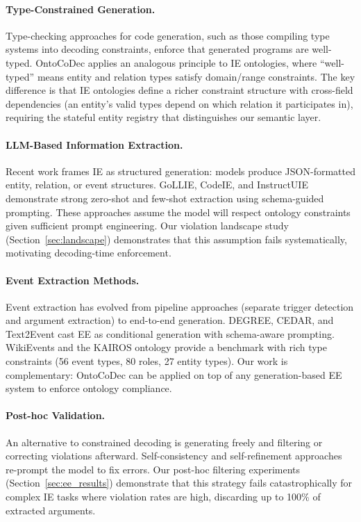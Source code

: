 \documentclass[11pt,a4paper]{article}
\newcommand{\sys}{OntoCoDec}
\begin{document}
\paragraph{Type-Constrained Generation.}
Type-checking approaches for code generation, such as those compiling type systems into decoding constraints, enforce that generated programs are well-typed. \sys{} applies an analogous principle to IE ontologies, where ``well-typed'' means entity and relation types satisfy domain/range constraints. The key difference is that IE ontologies define a richer constraint structure with cross-field dependencies (an entity's valid types depend on which relation it participates in), requiring the stateful entity registry that distinguishes our semantic layer.

\paragraph{LLM-Based Information Extraction.}
Recent work frames IE as structured generation: models produce JSON-formatted entity, relation, or event structures. GoLLIE, CodeIE, and InstructUIE demonstrate strong zero-shot and few-shot extraction using schema-guided prompting. These approaches assume the model will respect ontology constraints given sufficient prompt engineering. Our violation landscape study (Section~\ref{sec:landscape}) demonstrates that this assumption fails systematically, motivating decoding-time enforcement.

\paragraph{Event Extraction Methods.}
Event extraction has evolved from pipeline approaches (separate trigger detection and argument extraction) to end-to-end generation. DEGREE, CEDAR, and Text2Event cast EE as conditional generation with schema-aware prompting. WikiEvents and the KAIROS ontology provide a benchmark with rich type constraints (56 event types, 80 roles, 27 entity types). Our work is complementary: \sys{} can be applied on top of any generation-based EE system to enforce ontology compliance.

\paragraph{Post-hoc Validation.}
An alternative to constrained decoding is generating freely and filtering or correcting violations afterward. Self-consistency and self-refinement approaches re-prompt the model to fix errors. Our post-hoc filtering experiments (Section~\ref{sec:ee_results}) demonstrate that this strategy fails catastrophically for complex IE tasks where violation rates are high, discarding up to 100\% of extracted arguments.
\end{document}
